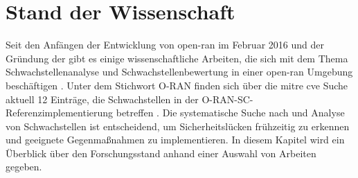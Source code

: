 \chapter{Stand der Wissenschaft}
\label{chap:forschungsstand}
Seit den Anfängen der Entwicklung von \gls{open-ran} im Februar 2016 und der Gründung der  gibt es einige wissenschaftliche Arbeiten, die sich mit dem Thema Schwachstellenanalyse und Schwachstellenbewertung in einer \gls{open-ran} Umgebung beschäftigen \autocite{ORANAlliance,GuideOpenRAN}. Unter dem Stichwort \glqq{}O-RAN\grqq{} finden sich über die \gls{mitre} \gls{cve} Suche aktuell 12 Einträge, die Schwachstellen in der O-RAN-SC-Referenzimplementierung betreffen \autocite{CVESearchResults}. Die systematische Suche nach und Analyse von Schwachstellen ist entscheidend, um Sicherheitslücken frühzeitig zu erkennen und geeignete Gegenmaßnahmen zu implementieren. In diesem Kapitel wird ein Überblick über den Forschungsstand anhand einer Auswahl von Arbeiten gegeben.

%
